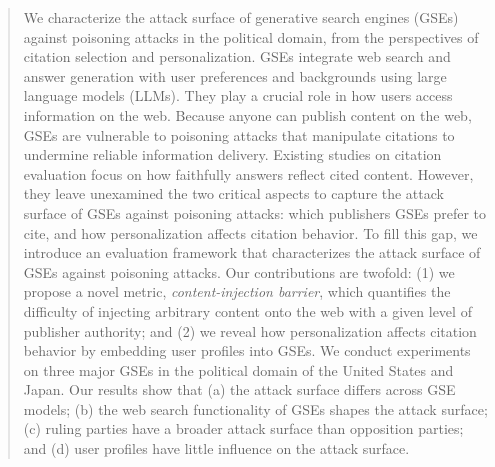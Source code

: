 \begin{abstract}
We characterize the attack surface of generative search engines (GSEs) against poisoning attacks in the political domain, from the perspectives of citation selection and personalization.
GSEs integrate web search and answer generation with user preferences and backgrounds using large language models (LLMs).
They play a crucial role in how users access information on the web.
Because anyone can publish content on the web, GSEs are vulnerable to poisoning attacks that manipulate citations to undermine reliable information delivery.
Existing studies on citation evaluation focus on how faithfully answers reflect cited content.
However, they leave unexamined the two critical aspects to capture the attack surface of GSEs against poisoning attacks: which publishers GSEs prefer to cite, and how personalization affects citation behavior.
To fill this gap, we introduce an evaluation framework that characterizes the attack surface of GSEs against poisoning attacks.
Our contributions are twofold: (1) we propose a novel metric, \emph{content-injection barrier}, which quantifies the difficulty of injecting arbitrary content onto the web with a given level of publisher authority; and (2) we reveal how personalization affects citation behavior by embedding user profiles into GSEs.
We conduct experiments on three major GSEs in the political domain of the United States and Japan.
Our results show that (a) the attack surface differs across GSE models; (b) the web search functionality of GSEs shapes the attack surface; (c) ruling parties have a broader attack surface than opposition parties; and (d) user profiles have little influence on the attack surface.
\end{abstract}